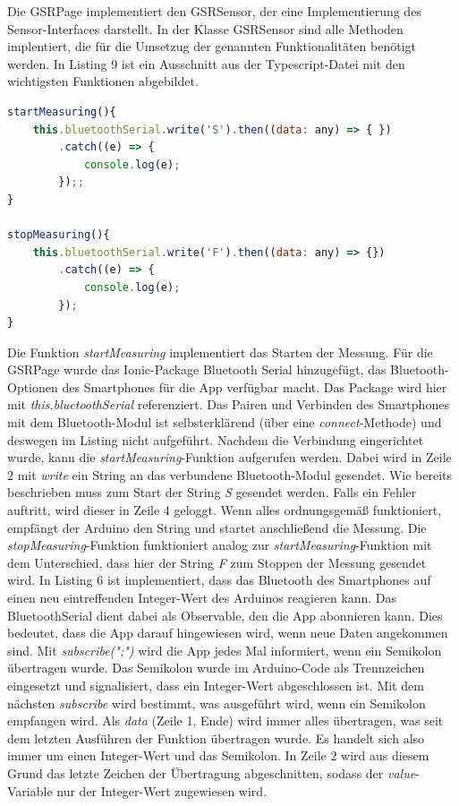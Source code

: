 Die GSRPage implementiert den GSRSensor, der eine Implementierung des Sensor-Interfaces darstellt. In der Klasse GSRSensor sind alle Methoden implentiert, die für die Umsetzug der genannten Funktionalitäten benötigt werden. In Listing 9 ist ein Ausschnitt aus der Typescript-Datei mit den wichtigsten Funktionen abgebildet. \newline \newline \newline
\begin{lstlisting}[caption={startMeasuring- und stopMeasuring-Funktion}, language=JavaScript]
startMeasuring(){
	this.bluetoothSerial.write('S').then((data: any) => { })
		.catch((e) => {
			console.log(e);
		});;
}

stopMeasuring(){
	this.bluetoothSerial.write('F').then((data: any) => {})
		.catch((e) => {
			console.log(e);
		});
}
\end{lstlisting}
Die Funktion \textit{startMeasuring} implementiert das Starten der Messung. Für die GSRPage wurde das Ionic-Package Bluetooth Serial hinzugefügt, das Bluetooth-Optionen des Smartphones für die App verfügbar macht. Das Package wird hier mit \textit{this.bluetoothSerial} referenziert. Das Pairen und Verbinden des Smartphones mit dem Bluetooth-Modul ist selbsterklärend (über eine \textit{connect}-Methode) und deswegen im Listing nicht aufgeführt. Nachdem die Verbindung eingerichtet wurde, kann die \textit{startMeasuring}-Funktion aufgerufen werden. Dabei wird in Zeile 2 mit \textit{write} ein String an das verbundene Bluetooth-Modul gesendet. Wie bereits beschrieben muss zum Start der String \textit{S} gesendet werden. Falls ein Fehler auftritt, wird dieser in Zeile 4 geloggt. Wenn alles ordnungsgemäß funktioniert, empfängt der Arduino den String und startet anschließend die Messung.\newline
Die \textit{stopMeasuring}-Funktion funktioniert analog zur \textit{startMeasuring}-Funktion mit dem Unterschied, dass hier der String \textit{F} zum Stoppen der Messung gesendet wird.
\newline
In Listing 6 ist implementiert, dass das Bluetooth des Smartphones auf einen neu eintreffenden Integer-Wert des Arduinos reagieren kann. Das BluetoothSerial dient dabei als Observable, den die App abonnieren kann. Dies bedeutet, dass die App darauf hingewiesen wird, wenn neue Daten angekommen sind. Mit \textit{subscribe(";")} wird die App jedes Mal informiert, wenn ein Semikolon übertragen wurde. Das Semikolon wurde im Arduino-Code als Trennzeichen eingesetzt und signalisiert, dass ein Integer-Wert abgeschlossen ist. Mit dem nächsten \textit{subscribe} wird bestimmt, was ausgeführt wird, wenn ein Semikolon empfangen wird. Als \textit{data} (Zeile 1, Ende) wird immer alles übertragen, was seit dem letzten Ausführen der Funktion übertragen wurde. Es handelt sich also immer um einen Integer-Wert und das Semikolon. In Zeile 2 wird aus diesem Grund das letzte Zeichen der Übertragung abgeschnitten, sodass der \textit{value}-Variable nur der Integer-Wert zugewiesen wird.
